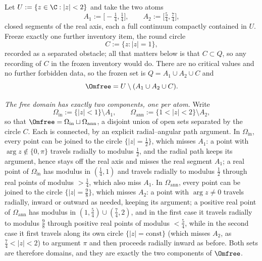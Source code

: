 \begin{example}
\label{ex:no-common-component}
Let $U:=\{z\in\C:|z|<2\}$ and take the two atoms
\[
A_1:=\bigl[-\tfrac14,\tfrac14\bigr],
\qquad
A_2:=\bigl[\tfrac54,\tfrac74\bigr],
\]
closed segments of the real axis, each a full continuum compactly contained in $U$.
Freeze exactly one further inventory item, the round circle
\[
C:=\{z:|z|=1\},
\]
recorded as a separated obstacle; all that matters below is that $C\subset Q$, so any
recording of $C$ in the frozen inventory would do. There
are no critical values and no further forbidden data, so the frozen set is
$Q=A_1\cup A_2\cup C$ and
\[
\Omfree=U\setminus(A_1\cup A_2\cup C).
\]

\emph{The free domain has exactly two components, one per atom.} Write
\[
\Omega_{\mathrm{in}}:=\{|z|<1\}\setminus A_1,
\qquad
\Omega_{\mathrm{ann}}:=\{1<|z|<2\}\setminus A_2,
\]
so that $\Omfree=\Omega_{\mathrm{in}}\sqcup\Omega_{\mathrm{ann}}$, a disjoint union of
open sets separated by the circle $C$. Each is connected, by an explicit radial--angular
path argument. In $\Omega_{\mathrm{in}}$, every point can be joined to the circle
$\{|z|=\tfrac12\}$, which misses $A_1$: a point with $\arg z\notin\{0,\pi\}$ travels
radially to modulus $\tfrac12$, and the radial path keeps its argument, hence stays off
the real axis and misses the real segment $A_1$; a real point of
$\Omega_{\mathrm{in}}$ has modulus in $(\tfrac14,1)$ and travels radially to modulus
$\tfrac12$ through real points of modulus $>\tfrac14$, which also miss $A_1$. In
$\Omega_{\mathrm{ann}}$, every point can be joined to the circle $\{|z|=\tfrac98\}$,
which misses $A_2$: a point with $\arg z\neq0$ travels radially, inward or
outward as needed, keeping its
argument; a positive real point of $\Omega_{\mathrm{ann}}$ has modulus in
$(1,\tfrac54)\cup(\tfrac74,2)$, and in the first case it travels radially to
modulus $\tfrac98$ through positive real points of modulus $<\tfrac54$, while in the
second case it first travels along its own circle $\{|z|=\mathrm{const}\}$ (which
misses $A_2$, as $\tfrac74<|z|<2$) to argument $\pi$ and then proceeds radially inward
as before. Both sets are
therefore domains, and they are exactly the two components of $\Omfree$.


\end{example}
